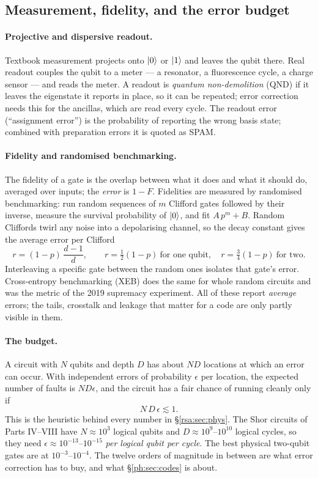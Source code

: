 \subsection{Measurement, fidelity, and the error budget}\label{ph:sec:fid}

\paragraph{Projective and dispersive readout.} Textbook measurement projects onto $\lvert 0 \rangle$ or
$\lvert 1 \rangle$ and leaves the qubit there. Real readout couples the qubit to a meter --- a resonator, a
fluorescence cycle, a charge sensor --- and reads the meter. A readout is \emph{quantum
non-demolition} (QND) if it leaves the eigenstate it reports in place, so it can be repeated;
error correction needs this for the ancillas, which are read every cycle. The readout error
(``assignment error'') is the probability of reporting the wrong basis state; combined with
preparation errors it is quoted as SPAM.

\paragraph{Fidelity and randomised benchmarking.} The fidelity of a gate is the overlap between
what it does and what it should do, averaged over inputs; the \emph{error} is $1-F$. Fidelities
are measured by randomised benchmarking: run random sequences of $m$ Clifford gates followed by
their inverse, measure the survival probability of $\lvert 0 \rangle$, and fit $A\,p^m+B$. Random Cliffords
twirl any noise into a depolarising channel, so the decay constant gives the average error per
Clifford
\[ r=(1-p)\,\frac{d-1}{d},\qquad r=\tfrac12(1-p)\ \text{for one qubit},\quad r=\tfrac34(1-p)\ \text{for two}. \]
Interleaving a specific gate between the random ones isolates that gate's error. Cross-entropy
benchmarking (XEB) does the same for whole random circuits and was the metric of the 2019
supremacy experiment. All of these report \emph{average} errors; the tails, crosstalk and
leakage that matter for a code are only partly visible in them.

\paragraph{The budget.} A circuit with $N$ qubits and depth $D$ has about $ND$ locations at which
an error can occur. With independent errors of probability $\epsilon$ per location, the expected
number of faults is $ND\epsilon$, and the circuit has a fair chance of running cleanly only if
\[ N\,D\,\epsilon\lesssim1 . \]
This is the heuristic behind every number in \S\ref{rsa:sec:phys}. The Shor circuits of Parts
IV--VIII have $N\approx10^3$ logical qubits and $D\approx10^9$--$10^{10}$ logical cycles, so they
need $\epsilon\approx10^{-13}$--$10^{-15}$ \emph{per logical qubit per cycle}. The best physical
two-qubit gates are at $10^{-3}$--$10^{-4}$. The twelve orders of magnitude in between are what
error correction has to buy, and what \S\ref{ph:sec:codes} is about.

